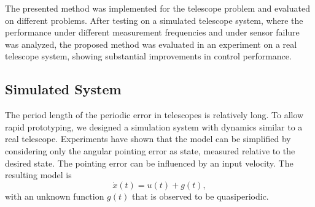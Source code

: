The presented method  was implemented for the telescope problem and evaluated
on different problems. After testing on a simulated telescope system, where the
performance under different measurement frequencies and under sensor failure was
analyzed, the proposed method was evaluated in an experiment on a real
telescope system, showing substantial improvements in control performance.

\subsection{Simulated System}
\label{sec:pec-simulation}

The period length of the periodic error in telescopes is relatively long. To
allow rapid prototyping, we designed a simulation system with dynamics similar
to a real telescope. Experiments have shown that the model can be simplified by
considering only the angular pointing error as state, measured relative to the
desired state. The pointing error can be influenced by an input velocity.
The resulting model is
\begin{equation}
  \dot x(t) = u(t) + g(t),
\end{equation}
with an unknown function $g(t)$ that is observed to be quasiperiodic.

